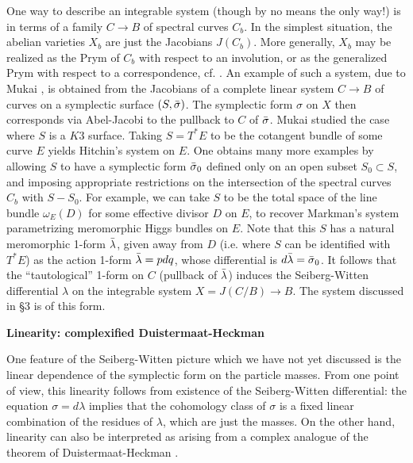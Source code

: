 One way to describe an integrable system (though by no means the 
only way!)
is in terms of a family $C\to B$ of spectral curves $C_b$.  In 
the simplest
situation, the abelian varieties $X_b$ are just the Jacobians 
$J (C_b)$.
More generally, $X_b$ may be realized as the Prym of $C_b$ with 
respect to an
involution, or as the generalized Prym with respect to a 
correspondence, cf.
\cite{D1}.
An example of such a system, due to Mukai \cite{Mu}, is obtained 
from the Jacobians of
a complete linear system $C\to B$ of curves on a symplectic surface
$(S,\bar{\sigma})$.  The symplectic form $\sigma$ on $X$ then corresponds 
via
Abel-Jacobi to the pullback to $C$ of $\bar{\sigma}$.  Mukai studied the 
case where $S$ is a
$K3$ surface.  Taking $S = T^*E$ to be the cotangent bundle of some 
curve $E$
yields Hitchin's system on $E$.  One obtains many more examples by 
allowing $S$
to have a symplectic form $\bar{\sigma}{_0}$ defined only on an open subset
$S_0\subset S$, and imposing appropriate restrictions on the 
intersection of the
spectral curves $C_b$ with $S-S_0$.  For example, we can take 
$S$ to be the total
space of the line bundle $\omega_E(D)$ for some effective divisor 
$D$ on $E$, to
recover Markman's system \cite{Mn} parametrizing meromorphic 
Higgs bundles on
$E$.  Note that this $S$ has a natural meromorphic 1-form 
$\bar{\lambda}$, given away
from $D$ (i.e. where $S$ can be identified with $T^*E$) as 
the action 1-form
$\bar{\lambda} = pdq$, whose differential is $d\bar{\lambda} = \bar{\sigma}{_0}$.  
It follows that
the ``tautological'' 1-form on $C$ (pullback of $\bar{\lambda}$) 
induces the
Seiberg-Witten differential $\lambda$ on the integrable 
system $X =
J(C/B)\to B$.  The system discussed in \S 3 is of this form.

\medskip\noindent
{\bf Linearity: complexified Duistermaat-Heckman}

One feature of the Seiberg-Witten picture which we have not yet 
discussed is the 
linear dependence of the symplectic form on the particle 
masses.  From one point
of view, this linearity follows from existence of the 
Seiberg-Witten
differential:  the equation $\sigma = d\lambda$ implies that 
the cohomology
class of $\sigma$ is a fixed linear combination of the residues 
of $\lambda$,
which are just the masses.  On the other hand, linearity can 
also be interpreted
as arising from a complex analogue of the theorem of 
Duistermaat-Heckman
\cite{DH}.

